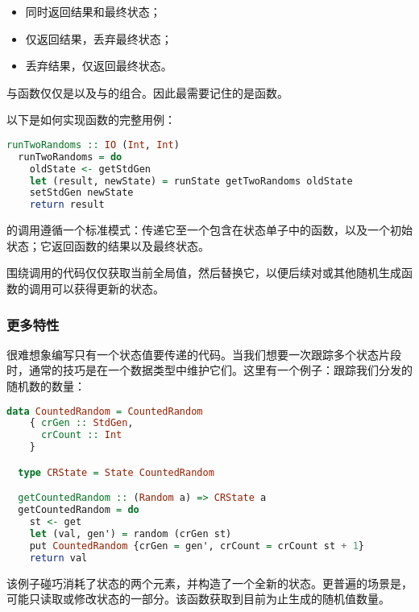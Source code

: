 \documentclass[./main.tex]{subfiles}
\begin{document}
\begin{itemize}
  \item {} 同时返回结果和最终状态；
  \item {} 仅返回结果，丢弃最终状态；
  \item {} 丢弃结果，仅返回最终状态。
\end{itemize}

与函数仅仅是以及与的组合。因此最需要记住的是函数。

以下是如何实现函数的完整用例：

\begin{lstlisting}[language=Haskell]
  runTwoRandoms :: IO (Int, Int)
  runTwoRandoms = do
    oldState <- getStdGen
    let (result, newState) = runState getTwoRandoms oldState
    setStdGen newState
    return result
\end{lstlisting}

的调用遵循一个标准模式：传递它至一个包含在状态单子中的函数，以及一个初始状态；它返回函数的结果以及最终状态。

围绕调用的代码仅仅获取当前全局值，然后替换它，以便后续对或其他随机生成函数的调用可以获得更新的状态。

\subsubsection*{更多特性}

很难想象编写只有一个状态值要传递的代码。当我们想要一次跟踪多个状态片段时，通常的技巧是在一个数据类型中维护它们。这里有一个例子：跟踪我们分发的随机数的数量：

\begin{lstlisting}[language=Haskell]
  data CountedRandom = CountedRandom
    { crGen :: StdGen,
      crCount :: Int
    }

  type CRState = State CountedRandom

  getCountedRandom :: (Random a) => CRState a
  getCountedRandom = do
    st <- get
    let (val, gen') = random (crGen st)
    put CountedRandom {crGen = gen', crCount = crCount st + 1}
    return val
\end{lstlisting}

该例子碰巧消耗了状态的两个元素，并构造了一个全新的状态。更普遍的场景是，可能只读取或修改状态的一部分。该函数获取到目前为止生成的随机值数量。
\end{document}
